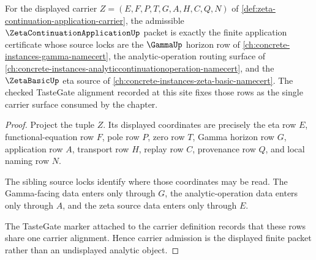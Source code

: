 \begin{theorem}
\label{thm:zeta-continuation-application-carrier-admission}
For the displayed carrier $Z=(E,F,P,T,G,A,H,C,Q,N)$ of \autoref{def:zeta-continuation-application-carrier}, the admissible $\ZetaContinuationApplicationUp$ packet is exactly the finite application certificate whose source locks are the $\GammaUp$ horizon row of \autoref{ch:concrete-instances-gamma-namecert}, the analytic-operation routing surface of \autoref{ch:concrete-instances-analyticcontinuationoperation-namecert}, and the $\ZetaBasicUp$ eta source of \autoref{ch:concrete-instances-zeta-basic-namecert}. The checked TasteGate alignment recorded at this site fixes those rows as the single carrier surface consumed by the chapter.
\end{theorem}
\begin{proof}
Project the tuple $Z$. Its displayed coordinates are precisely the eta row $E$, functional-equation row $F$, pole row $P$, zero row $T$, Gamma horizon row $G$, application row $A$, transport row $H$, replay row $C$, provenance row $Q$, and local naming row $N$.

The sibling source locks identify where those coordinates may be read. The Gamma-facing data enters only through $G$, the analytic-operation data enters only through $A$, and the zeta source data enters only through $E$.

The TasteGate marker attached to the carrier definition records that these rows share one carrier alignment. Hence carrier admission is the displayed finite packet rather than an undisplayed analytic object.
\end{proof}


